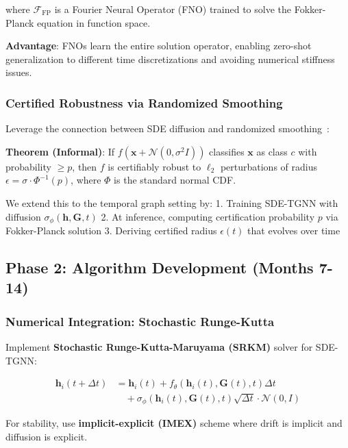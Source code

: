 \documentclass[11pt]{article}
\begin{document}
where $\mathcal{F}_{\text{FP}}$ is a Fourier Neural Operator (FNO) trained to solve the Fokker-Planck equation in function space.

\textbf{Advantage}: FNOs learn the entire solution operator, enabling zero-shot generalization to different time discretizations and avoiding numerical stiffness issues.

\subsubsection{Certified Robustness via Randomized Smoothing}

Leverage the connection between SDE diffusion and randomized smoothing~\cite{cohen2019certified}:

\textbf{Theorem (Informal)}: If $f(\mathbf{x} + \mathcal{N}(0, \sigma^2 I))$ classifies $\mathbf{x}$ as class $c$ with probability $\geq p$, then $f$ is certifiably robust to $\ell_2$ perturbations of radius $\epsilon = \sigma \cdot \Phi^{-1}(p)$, where $\Phi$ is the standard normal CDF.

We extend this to the temporal graph setting by:
1. Training SDE-TGNN with diffusion $\sigma_\phi(\mathbf{h}, \mathbf{G}, t)$
2. At inference, computing certification probability $p$ via Fokker-Planck solution
3. Deriving certified radius $\epsilon(t)$ that evolves over time

\subsection{Phase 2: Algorithm Development (Months 7-14)}

\subsubsection{Numerical Integration: Stochastic Runge-Kutta}

Implement \textbf{Stochastic Runge-Kutta-Maruyama (SRKM)} solver for SDE-TGNN:

\begin{equation}
\begin{aligned}
\mathbf{h}_i(t + \Delta t) &= \mathbf{h}_i(t) + f_\theta(\mathbf{h}_i(t), \mathbf{G}(t), t) \Delta t \\
&\quad + \sigma_\phi(\mathbf{h}_i(t), \mathbf{G}(t), t) \sqrt{\Delta t} \cdot \mathcal{N}(0, I)
\end{aligned}
\end{equation}

For stability, use \textbf{implicit-explicit (IMEX)} scheme where drift is implicit and diffusion is explicit.
\end{document}
